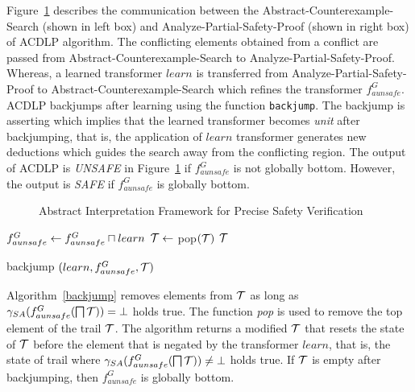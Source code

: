 {Figure~\ref{acdlp-fig} describes the communication between the Abstract-Counterexample-Search (shown in left box) and Analyze-Partial-Safety-Proof (shown in right box) of ACDLP algorithm.  The conflicting elements obtained from a conflict are passed from Abstract-Counterexample-Search to Analyze-Partial-Safety-Proof.
Whereas, a learned transformer $learn$ is transferred from Analyze-Partial-Safety-Proof to Abstract-Counterexample-Search which 
refines the transformer $f_{aunsafe}^G$.  ACDLP backjumps after learning using the function \texttt{backjump}.  The backjump is 
asserting which implies that the learned transformer becomes \emph{unit} after backjumping, that is, the application of $learn$ 
transformer generates new deductions which guides the search away from the conflicting region.   The output of ACDLP is \emph{UNSAFE} 
in Figure~\ref{acdlp-fig} if $f_{aunsafe}^G$ is not globally bottom.  However, the output is \emph{SAFE} if $f_{aunsafe}^G$ is globally bottom.    
%
%
\begin{figure}[htbp]
\centering
\vspace*{-0.2cm}
\caption{Abstract Interpretation Framework for Precise Safety Verification \label{acdlp-fig}}
\end{figure}
%
%

%
{\begin{algorithm2e}[t]
\DontPrintSemicolon
{}
\begin{small}
 	
	
        $f_{aunsafe}^G \leftarrow f_{aunsafe}^G \sqcap learn$ \; 
	 {
		$\mathcal{T} \leftarrow$ pop$(\mathcal{T})$ \;
	}
	{\return $\mathcal{T}$}
\end{small}
	\caption{backjump $(learn, f_{aunsafe}^G, \mathcal{T})$ \label{backjump}}
\end{algorithm2e}
%
Algorithm~\ref{backjump} removes elements from $\mathcal{T}$ as long as  
$\gamma_{SA}(f_{aunsafe}^G(\bigsqcap \mathcal{T})) = \bot$ holds true.  The 
function \emph{pop} is used to remove the top element of the trail $\mathcal{T}$. 
The algorithm returns a modified $\mathcal{T}$ that resets the state of $\mathcal{T}$ 
before the element that is negated by the transformer $learn$, that is, the 
state of trail where $\gamma_{SA}(f_{aunsafe}^G(\bigsqcap \mathcal{T})) \neq \bot$ 
holds true.  If $\mathcal{T}$ is empty after backjumping, then $f_{aunsafe}^G$ is 
globally bottom. 


}}
